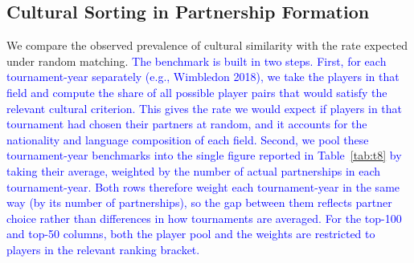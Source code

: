 \documentclass[10pt]{article}
\begin{document}
\subsection{Cultural Sorting in Partnership Formation}
\label{sec:sorting}



We compare the observed prevalence of cultural similarity with the rate expected under random matching. \textcolor{blue}{The benchmark is built in two steps. First, for each tournament-year separately (e.g., Wimbledon 2018), we take the players in that field and compute the share of all possible player pairs that would satisfy the relevant cultural criterion. This gives the rate we would expect if players in that tournament had chosen their partners at random, and it accounts for the nationality and language composition of each field. Second, we pool these tournament-year benchmarks into the single figure reported in Table~\ref{tab:t8} by taking their average, weighted by the number of actual partnerships in each tournament-year. Both rows therefore weight each tournament-year in the same way (by its number of partnerships), so the gap between them reflects partner choice rather than differences in how tournaments are averaged. For the top-100 and top-50 columns, both the player pool and the weights are restricted to players in the relevant ranking bracket.}
\end{document}
